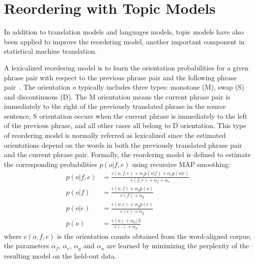 \section{Reordering with Topic Models}

In addition to translation models and languages models, topic models have also been applied to improve the reordering model, another important component in statistical machine translation.


A lexicalized reordering model is to learn the orientation probabilities for a given phrase pair with respect to the previous phrase pair and the following phrase pair~\citep{Chen-2013}. The orientation $o$ typically includes three types: monotone (M), swap (S) and discontinuous (D). The M orientation means the current phrase pair is immediately to the right of the previously translated phrase in the source sentence, S orientation occurs when the current phrase is immediately to the left of the previous phrase, and all other cases all belong to D orientation. This type of reordering model is normally referred as lexicalized since the estimated orientations depend on the words in both the previously translated phrase pair and the current phrase pair. Formally, the reordering model is defined to estimate the corresponding probabilities $p(o|f,e)$ using recursive MAP smoothing:
\begin{align}
p(o|f,e) &= \frac{c(o,f,e) + \alpha_f p(o|f) + \alpha_e p(o|e)}{c(f,e) + \alpha_f + \alpha_e} \\
p(o|f) &= \frac{c(o,f) + \alpha_g p(o)}{c(f) + \alpha_g} \\
p(o|e) &= \frac{c(o,e) + \alpha_g p(e)}{c(e) + \alpha_g} \\
p(o) &= \frac{c(o) + \alpha_u/3}{c(\cdot) + \alpha_u}
\end{align}
where $c(o,f,e)$ is the orientation counts obtained from the word-aligned corpus;  the parameters $\alpha_f$, $\alpha_e$, $\alpha_g$ and $\alpha_u$ are learned by minimizing the perplexity of the resulting model on the held-out data.

